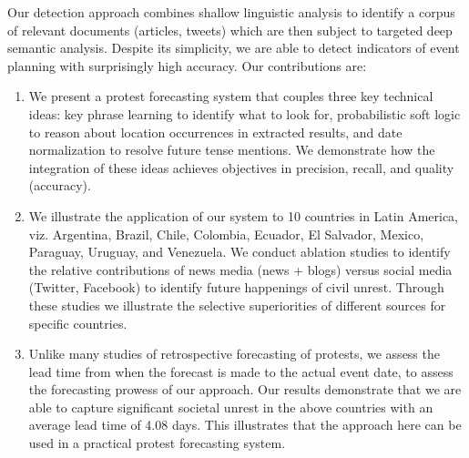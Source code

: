 Our detection approach 
combines shallow linguistic analysis to identify a corpus of relevant
documents (articles, tweets) which are then subject to targeted deep semantic analysis.
Despite its simplicity, we are able to
detect indicators of event planning with surprisingly high
accuracy. 
Our contributions are:
\begin{enumerate}
\item We present a protest forecasting system that couples three key technical ideas:
key phrase learning to identify what to look for, probabilistic soft logic to reason about location occurrences in extracted results, and 
date normalization to resolve future tense mentions. We demonstrate how the integration of these ideas achieves objectives in precision,
recall, and quality (accuracy).
\item We illustrate the application of our system to 10 countries in Latin America, viz. Argentina, Brazil, Chile, Colombia, Ecuador, El Salvador, Mexico, Paraguay, Uruguay, and Venezuela. 
We conduct ablation studies to identify the 
relative contributions of news media (news + blogs) versus social media (Twitter, Facebook) to identify future happenings of
civil unrest. Through these studies we illustrate the selective superiorities of different sources for specific countries.
\item Unlike many studies of retrospective forecasting of protests,
we assess the lead time from when the forecast is made to
the actual event date, to assess the forecasting prowess of our approach. 
Our results demonstrate that we are able to 
capture significant societal unrest in the above countries with an average lead time of 4.08 days. This illustrates that the
approach here can be used in a practical protest forecasting system.
\end{enumerate}

